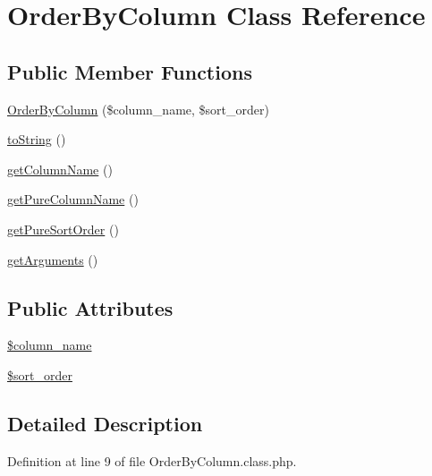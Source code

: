 \hypertarget{classOrderByColumn}{\section{Order\-By\-Column Class Reference}
\label{classOrderByColumn}
}
\subsection*{Public Member Functions}
\begin{DoxyCompactItemize}
\item 
\hyperlink{classOrderByColumn_a42a97dd505843873eb5cac1ea67e85a1}{Order\-By\-Column} (\$column\-\_\-name, \$sort\-\_\-order)
\item 
\hyperlink{classOrderByColumn_a6db0b86d7ed8ac3a9467ad9c2b70a022}{to\-String} ()
\item 
\hyperlink{classOrderByColumn_aa6e094dc084a79fa96a6cc529ac4431f}{get\-Column\-Name} ()
\item 
\hyperlink{classOrderByColumn_a11d8fa0bb15e4089d6cedde469f51aa7}{get\-Pure\-Column\-Name} ()
\item 
\hyperlink{classOrderByColumn_a7279ca2da1f1376de633eef931ff86ff}{get\-Pure\-Sort\-Order} ()
\item 
\hyperlink{classOrderByColumn_affbf2de8abb67fedf4fac695a2824392}{get\-Arguments} ()
\end{DoxyCompactItemize}
\subsection*{Public Attributes}
\begin{DoxyCompactItemize}
\item 
\hyperlink{classOrderByColumn_a4c1243e9acca95ecc01d0a37856be6e1}{\$column\-\_\-name}
\item 
\hyperlink{classOrderByColumn_ad62eb7e1435d62f643135df8094efba5}{\$sort\-\_\-order}
\end{DoxyCompactItemize}


\subsection{Detailed Description}


Definition at line 9 of file Order\-By\-Column.\-class.\-php.



